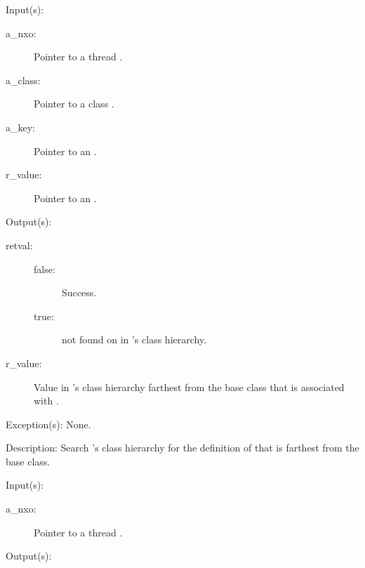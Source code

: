 \begin{capi}
	\begin{capilist}
	\item[Input(s): ]
		\begin{description}\item[]
		\item[a\_nxo: ]
			Pointer to a thread .
		\item[a\_class: ]
			Pointer to a class .
		\item[a\_key: ]
			Pointer to an .
		\item[r\_value: ]
			Pointer to an .
		\end{description}
	\item[Output(s): ]
		\begin{description}\item[]
		\item[retval: ]
			\begin{description}\item[]
			\item[false: ]
				Success.
			\item[true: ]
				 not found on in
				's class hierarchy.
			\end{description}
		\item[r\_value: ]
			Value in 's class hierarchy farthest
			from the base class that is associated with
			.
		\end{description}
	\item[Exception(s): ] None.
	\item[Description: ]
		Search 's class hierarchy for the definition
		of  that is farthest from the base class.
	\end{capilist}
\label{nxo_thread_currentlocking}
	\begin{capilist}
	\item[Input(s): ]
		\begin{description}\item[]
		\item[a\_nxo: ]
			Pointer to a thread \classname{nxo}.
		\end{description}
	\item[Output(s): ]

\end{capilist}
\end{capi}

